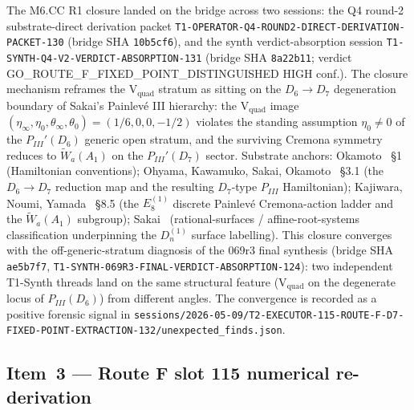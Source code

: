 \documentclass[11pt,a4paper]{article}
\theoremstyle{definition}
\theoremstyle{remark}
\begin{document}
The M6.CC R1 closure landed on the bridge across two sessions: the
Q4 round-2 substrate-direct derivation packet
\texttt{T1-OPERATOR-Q4-ROUND2-DIRECT-DERIVATION-PACKET-130}
(bridge SHA \texttt{10b5cf6}), and the synth verdict-absorption
session \texttt{T1-SYNTH-Q4-V2-VERDICT-ABSORPTION-131}
(bridge SHA \texttt{8a22b11}; verdict
\textsf{GO\_ROUTE\_F\_FIXED\_POINT\_DISTINGUISHED} HIGH conf.).
The closure mechanism reframes the V$_{\mathrm{quad}}$ stratum as
sitting on the $D_6 \to D_7$ degeneration boundary of Sakai's
Painlev\'e III hierarchy: the V$_{\mathrm{quad}}$ image
$(\eta_\infty, \eta_0, \theta_\infty, \theta_0) = (1/6, 0, 0, -1/2)$
violates the standing assumption $\eta_0 \neq 0$ of the
$P_{III}'(D_6)$ generic open stratum, and the surviving Cremona
symmetry reduces to $\widetilde{W}_a(A_1)$ on the
$P_{III}'(D_7)$ sector. Substrate anchors:
Okamoto~\cite{Okamoto1987} \S 1 (Hamiltonian conventions);
Ohyama, Kawamuko, Sakai, Okamoto~\cite{Ohyama2006} \S 3.1
(the $D_6 \to D_7$ reduction map and the resulting $D_7$-type
$P_{III}$ Hamiltonian);
Kajiwara, Noumi, Yamada~\cite{KNY2017} \S 8.5 (the $E_8^{(1)}$
discrete Painlev\'e Cremona-action ladder and the
$\widetilde{W}_a(A_1)$ subgroup);
Sakai~\cite{Sakai2001} (rational-surfaces / affine-root-systems
classification underpinning the $D_n^{(1)}$ surface labelling).
This closure converges with the off-generic-stratum diagnosis of
the 069r3 final synthesis (bridge SHA \texttt{ae5b7f7},
\texttt{T1-SYNTH-069R3-FINAL-VERDICT-ABSORPTION-124}): two
independent T1-Synth threads land on the same structural feature
(V$_{\mathrm{quad}}$ on the degenerate locus of $P_{III}(D_6)$) from
different angles. The convergence is recorded as a positive forensic
signal in \texttt{sessions/2026-05-09/T2-EXECUTOR-115-ROUTE-F-D7-FIXED-POINT-EXTRACTION-132/unexpected\_finds.json}.

\subsection{Item~3 --- Route F slot 115 numerical re-derivation}
\label{sec:closure-cascade-route-f}
\end{document}
